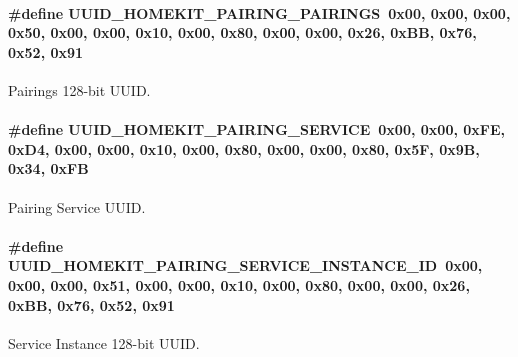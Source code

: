 \paragraph[{\texorpdfstring{U\+U\+I\+D\+\_\+\+H\+O\+M\+E\+K\+I\+T\+\_\+\+P\+A\+I\+R\+I\+N\+G\+\_\+\+P\+A\+I\+R\+I\+N\+GS}{UUID_HOMEKIT_PAIRING_PAIRINGS}}]{\setlength{\rightskip}{0pt plus 5cm}\#define U\+U\+I\+D\+\_\+\+H\+O\+M\+E\+K\+I\+T\+\_\+\+P\+A\+I\+R\+I\+N\+G\+\_\+\+P\+A\+I\+R\+I\+N\+GS~0x00, 0x00, 0x00, 0x50, 0x00, 0x00, 0x10, 0x00, 0x80, 0x00, 0x00, 0x26, 0x\+B\+B, 0x76, 0x52, 0x91}\hypertarget{group___h_p_s_gab3bc83b2ae62e6e88d3824cecc9197b7}{}\label{group___h_p_s_gab3bc83b2ae62e6e88d3824cecc9197b7}
Pairings 128-\/bit U\+U\+ID. 
\paragraph[{\texorpdfstring{U\+U\+I\+D\+\_\+\+H\+O\+M\+E\+K\+I\+T\+\_\+\+P\+A\+I\+R\+I\+N\+G\+\_\+\+S\+E\+R\+V\+I\+CE}{UUID_HOMEKIT_PAIRING_SERVICE}}]{\setlength{\rightskip}{0pt plus 5cm}\#define U\+U\+I\+D\+\_\+\+H\+O\+M\+E\+K\+I\+T\+\_\+\+P\+A\+I\+R\+I\+N\+G\+\_\+\+S\+E\+R\+V\+I\+CE~0x00, 0x00, 0x\+F\+E, 0x\+D4, 0x00, 0x00, 0x10, 0x00, 0x80, 0x00, 0x00, 0x80, 0x5\+F, 0x9\+B, 0x34, 0x\+FB}\hypertarget{group___h_p_s_gae6c1676b1175a75ff30ee3ed95ae593b}{}\label{group___h_p_s_gae6c1676b1175a75ff30ee3ed95ae593b}
Pairing Service U\+U\+ID. 
\paragraph[{\texorpdfstring{U\+U\+I\+D\+\_\+\+H\+O\+M\+E\+K\+I\+T\+\_\+\+P\+A\+I\+R\+I\+N\+G\+\_\+\+S\+E\+R\+V\+I\+C\+E\+\_\+\+I\+N\+S\+T\+A\+N\+C\+E\+\_\+\+ID}{UUID_HOMEKIT_PAIRING_SERVICE_INSTANCE_ID}}]{\setlength{\rightskip}{0pt plus 5cm}\#define U\+U\+I\+D\+\_\+\+H\+O\+M\+E\+K\+I\+T\+\_\+\+P\+A\+I\+R\+I\+N\+G\+\_\+\+S\+E\+R\+V\+I\+C\+E\+\_\+\+I\+N\+S\+T\+A\+N\+C\+E\+\_\+\+ID~0x00, 0x00, 0x00, 0x51, 0x00, 0x00, 0x10, 0x00, 0x80, 0x00, 0x00, 0x26, 0x\+B\+B, 0x76, 0x52, 0x91}\hypertarget{group___h_p_s_gac12ba9f81955a84b099e1c80c80fd495}{}\label{group___h_p_s_gac12ba9f81955a84b099e1c80c80fd495}
Service Instance 128-\/bit U\+U\+ID. 

